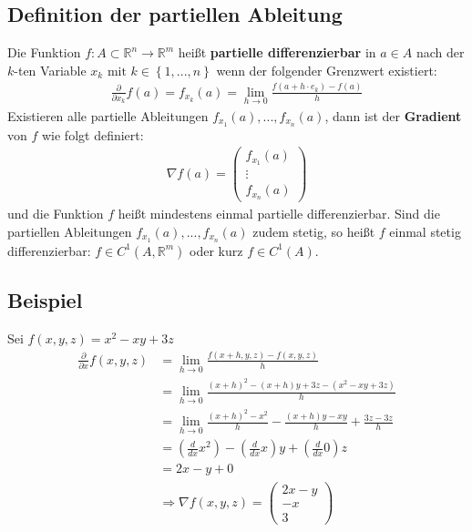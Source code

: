 \documentclass[11pt,a4paper]{book}
\newcommand {\Rn}	{\mathbb{R}^n}
\newcommand {\Rm}	{\mathbb{R}^m}
\newcommand{\1}    	{\mathbbm{1}}
\newcommand{\mitt}	{\textrm{ mit }}
\begin{document}
\subsection{Definition der partiellen Ableitung}
Die Funktion \(f : A \subset \Rn \rightarrow \Rm\) heißt \textbf{partielle differenzierbar} in \(a \in A\) nach der \(k\)-ten Variable \(x_k \mitt k \in \left\{ 1, ..., n\right\} \) wenn der folgender Grenzwert existiert:
\begin{align*}
	\frac{\partial}{\partial x_k} f(a) = f_{x_k}(a) = \lim_{h \rightarrow 0} \frac{f(a + h \cdot e_k) - f(a)}{h}
\end{align*}
Existieren alle partielle Ableitungen \(f_{x_1}(a), ..., f_{x_n}(a)\), dann ist der \textbf{Gradient} von \(f\) wie folgt definiert:
\begin{align*}
	\nabla f(a) = \left( \begin{array}{c}
		f_{x_1} (a) \\
		\vdots \\
		f_{x_n} (a)
	\end{array} \right)
\end{align*}
und die Funktion \(f\) heißt mindestens einmal partielle differenzierbar. Sind die partiellen Ableitungen \(f_{x_1}(a), ..., f_{x_n}(a)\) zudem stetig, so heißt \(f\) einmal stetig differenzierbar: \( f \in C^1(A,\Rm)\) oder kurz \( f \in C^1(A) \).

\subsection{Beispiel}
Sei \(f(x,y,z) = x^2 - xy + 3z\)
\begin{align*}
	\frac{\partial}{\partial x} f(x,y,z) &= 
	\lim_{h \rightarrow 0} \frac{f(x+h,y,z) - f(x,y,z)}{h} \\
	&= \lim_{h \rightarrow 0} \frac{(x+h)^2 - (x+h)y + 3z - ( x^2 - xy + 3z)}{h} \\
	&= \lim_{h \rightarrow 0} \frac{(x+h)^2 - x^2}{h} - \frac{(x+h)y-xy}{h} + \frac{3z - 3z}{h} \\
	&= \left( \frac{d}{dx} x^2 \right) - \left( \frac{d}{dx} x \right)y + \left( \frac{d}{dx} 0 \right) z \\
	&= 2x - y + 0 \\
	&\Rightarrow \nabla f(x,y,z) = \left( \begin{array}{c}
		2x - y \\
		-x \\
		3	
	\end{array} \right)
\end{align*}
\end{document}
